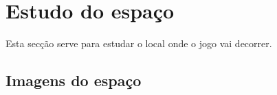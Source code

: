 \section{Estudo do espaço}

Esta secção serve para estudar o local onde o jogo vai decorrer.

\subsection{Imagens do espaço}
\ShowSpacePhotos
{}

